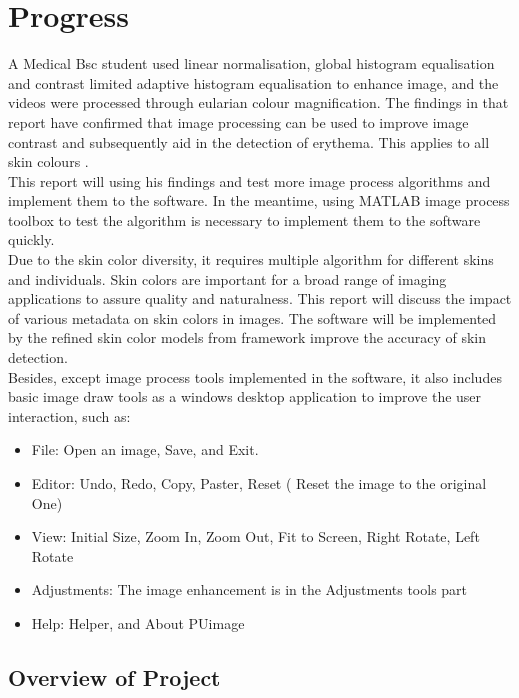 

\chapter{Progress} 

A Medical Bsc student used linear normalisation, global histogram equalisation and contrast limited adaptive histogram equalisation to enhance image, and the videos were processed through eularian colour magnification. The findings in that report have confirmed that image processing can be used to improve image contrast and subsequently aid in the detection of erythema. This applies to all skin colours \cite{Mohammed}.\\

This report will using his findings and test more image process algorithms and implement them to the software. In the meantime, using MATLAB image process toolbox to test the algorithm is necessary to implement them to the software quickly.\\

Due to the skin color diversity, it requires multiple algorithm for different skins and individuals. Skin colors are important for a broad range of imaging applications to assure quality and naturalness. This report will discuss the impact of various metadata on skin colors in images. The software will be implemented by the
refined skin color models from framework improve the accuracy of skin detection.\\

Besides, except image process tools implemented in the software, it also includes basic image draw tools as a windows desktop application to improve the user interaction, such as:
\begin{itemize}
\item File: Open an image, Save, and Exit.
\item Editor: Undo, Redo, Copy, Paster, Reset ( Reset the image to the original One)
\item View: Initial Size, Zoom In, Zoom Out, Fit to Screen, Right Rotate, Left Rotate
\item Adjustments: The image enhancement is in the Adjustments tools part
\item Help: Helper, and About PUimage
\end{itemize}

\section{Overview of Project}

